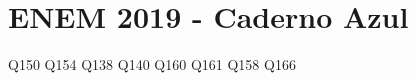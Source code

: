 \chapter{ENEM 2019 - Caderno Azul}


{Q150}
{Q154}
{Q138}
{Q140}
{Q160}
{Q161}
%
%
{Q158}
{Q166}



